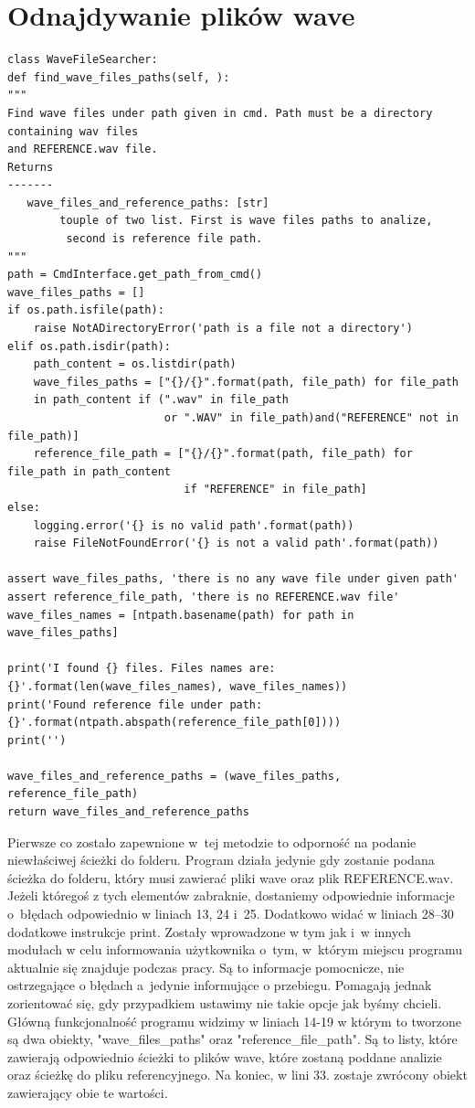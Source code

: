 \documentclass[eng,printmode]{mgr}
\begin{document}
\section{Odnajdywanie plików wave}
\begin{minipage}{\linewidth}
\begin{lstlisting}[caption={fragment kodu źródłowego pliku WaveFileSearcher.py},captionpos=b,label={WaveFileSearcher}]
class WaveFileSearcher:
def find_wave_files_paths(self, ):
"""
Find wave files under path given in cmd. Path must be a directory containing wav files
and REFERENCE.wav file.
Returns
-------
   wave_files_and_reference_paths: [str]
        touple of two list. First is wave files paths to analize,
         second is reference file path.
"""
path = CmdInterface.get_path_from_cmd()
wave_files_paths = []
if os.path.isfile(path):
    raise NotADirectoryError('path is a file not a directory')
elif os.path.isdir(path):
    path_content = os.listdir(path)
    wave_files_paths = ["{}/{}".format(path, file_path) for file_path
    in path_content if (".wav" in file_path
                        or ".WAV" in file_path)and("REFERENCE" not in file_path)]
    reference_file_path = ["{}/{}".format(path, file_path) for file_path in path_content
                           if "REFERENCE" in file_path]
else:
    logging.error('{} is no valid path'.format(path))
    raise FileNotFoundError('{} is not a valid path'.format(path))

assert wave_files_paths, 'there is no any wave file under given path'
assert reference_file_path, 'there is no REFERENCE.wav file'
wave_files_names = [ntpath.basename(path) for path in wave_files_paths]

print('I found {} files. Files names are: {}'.format(len(wave_files_names), wave_files_names))
print('Found reference file under path: {}'.format(ntpath.abspath(reference_file_path[0])))
print('')

wave_files_and_reference_paths = (wave_files_paths, reference_file_path)
return wave_files_and_reference_paths

\end{lstlisting}
\end{minipage}
Pierwsze co zostało zapewnione w~tej metodzie to odporność na podanie niewłaściwej ścieżki do folderu. Program działa jedynie gdy zostanie podana ścieżka do folderu, który musi zawierać pliki wave oraz plik REFERENCE.wav. Jeżeli któregoś z tych elementów zabraknie, dostaniemy odpowiednie informacje o~błędach odpowiednio w liniach 13, 24 i~25. Dodatkowo widać w liniach 28--30 dodatkowe instrukcje print. Zostały wprowadzone w tym jak i~w innych modułach w celu informowania użytkownika o~tym, w~którym miejscu programu aktualnie się znajduje podczas pracy. Są to informacje pomocnicze, nie ostrzegające o błędach a~jedynie informujące o przebiegu. Pomagają jednak zorientować się, gdy przypadkiem ustawimy nie takie opcje jak byśmy chcieli. Główną funkcjonalność programu widzimy w liniach 14-19 w którym to tworzone są dwa obiekty, "wave\_files\_paths" oraz "reference\_file\_path". Są to listy, które zawierają odpowiednio ścieżki to plików wave, które zostaną poddane analizie oraz ścieżkę do pliku referencyjnego. Na koniec, w lini 33. zostaje zwrócony obiekt zawierający obie te  wartości.
\end{document}
